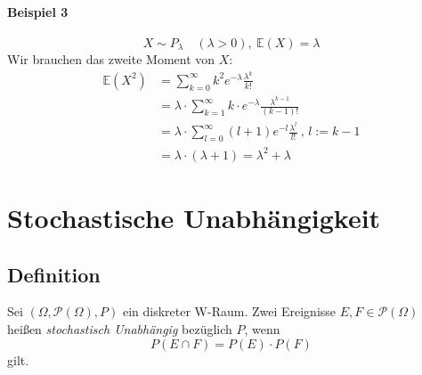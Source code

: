 \documentclass[12pt,a4paper]{article}
\begin{document}
 	\paragraph{Beispiel 3}
 	$$X\sim P_{\lambda} \quad (\lambda>0), \: \mathbb{E}(X)=\lambda$$
 	Wir brauchen das zweite Moment von $X$:
 	\begin{equation*}
 	\begin{split}
	\mathbb{E}(X^2) & =\sum_{k=0}^{\infty}k^2 e^{-\lambda}\frac{\lambda^k}{k!} \\
	& = \lambda\cdot\sum_{k=1}^{\infty}k\cdot e^{-\lambda}\frac{\lambda^{k-1}}{(k-1)!}\\
	& = \lambda\cdot\sum_{l=0}^{\infty}(l+1)e^{-l}\frac{\lambda^l}{l!} \: , \, l:=k-1\\
	& = \lambda\cdot (\lambda+1)=\lambda^2 + \lambda	
 	\end{split}
 	\end{equation*}
 	
 	\section{Stochastische Unabhängigkeit}
	\subsection{Definition}
	Sei $\left(\Omega,\mathcal{P}(\Omega),P\right)$ ein diskreter W-Raum. Zwei Ereignisse $E,F\in\mathcal{P}(\Omega)$ heißen \textit{stochastisch Unabhängig} bezüglich $P$, wenn
	$$P(E\cap F)=P(E) \cdot P(F)$$
	gilt.
\end{document}
